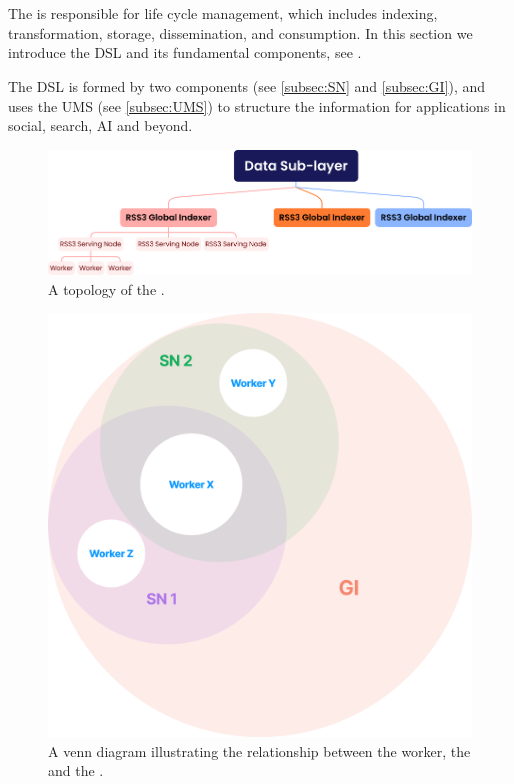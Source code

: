 \section{}
\label{sec:DSL}

The  is responsible for  life cycle management, which includes indexing, transformation, storage, dissemination, and consumption.
In this section we introduce the \gls{DSL} and its fundamental components, see .

The \gls{DSL} is formed by two components (see \cref{subsec:SN} and \cref{subsec:GI}), and uses the \gls{UMS} (see \cref{subsec:UMS}) to structure the information for applications in social, search, AI and beyond.

    {
        \begin{figure}[tb!]
            \centering
            \includegraphics[width=\columnwidth]{figures/DSL.png}
            \caption{A topology of the .}
            \label{fig:DSL}
        \end{figure}
    }


    {
        \begin{figure}[tb!]
            \centering
            \includegraphics[width=0.7\columnwidth]{figures/GI.png}
            \caption{A venn diagram illustrating the relationship between the worker, the  and the .}
            \label{fig:GI}
        \end{figure}
    }


